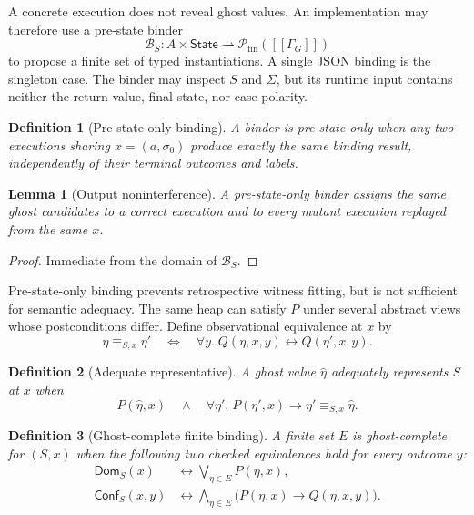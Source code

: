 \documentclass[10pt]{article}
\newtheorem{definition}{Definition}
\newtheorem{lemma}{Lemma}
\newcommand{\State}{\mathsf{State}}
\newcommand{\sem}[1]{[\![ #1 ]\!]}
\newcommand{\bind}{\mathcal{B}}
\newcommand{\ctx}{\Sigma}
\newcommand{\ghost}{\eta}
\begin{document}
A concrete execution does not reveal ghost values.  An implementation may
therefore use a pre-state binder
\[
  \bind_S : A\times\State
  \rightharpoonup \mathcal P_{\mathrm{fin}}(\sem{\Gamma_G})
\]
to propose a finite set of typed instantiations.  A single JSON binding is the
singleton case.  The binder may inspect $S$ and $\ctx$, but its runtime input
contains neither the return value, final state, nor case polarity.

\begin{definition}[Pre-state-only binding]
A binder is pre-state-only when any two executions sharing $x=(a,\sigma_0)$
produce exactly the same binding result, independently of their terminal
outcomes and labels.
\end{definition}

\begin{lemma}[Output noninterference]
A pre-state-only binder assigns the same ghost candidates to a correct
execution and to every mutant execution replayed from the same $x$.
\end{lemma}
\begin{proof}
Immediate from the domain of $\bind_S$.
\end{proof}

Pre-state-only binding prevents retrospective witness fitting, but is not
sufficient for semantic adequacy.  The same heap can satisfy $P$ under several
abstract views whose postconditions differ.  Define observational equivalence
at $x$ by
\[
  \ghost \equiv_{S,x} \ghost'
  \quad\Longleftrightarrow\quad
  \forall y.\;Q(\ghost,x,y)\leftrightarrow Q(\ghost',x,y).
\]

\begin{definition}[Adequate representative]
A ghost value $\widehat\ghost$ adequately represents $S$ at $x$ when
\[
  P(\widehat\ghost,x)
  \quad\land\quad
  \forall\ghost'.\;
    P(\ghost',x)\rightarrow
    \ghost'\equiv_{S,x}\widehat\ghost.
\]
\end{definition}

\begin{definition}[Ghost-complete finite binding]
A finite set $E$ is ghost-complete for $(S,x)$ when the following two checked
equivalences hold for every outcome $y$:
\[
\begin{split}
\mathsf{Dom}_S(x)
  &\leftrightarrow \bigvee_{\ghost\in E}P(\ghost,x),\\
\mathsf{Conf}_S(x,y)
  &\leftrightarrow
    \bigwedge_{\ghost\in E}\bigl(P(\ghost,x)\rightarrow Q(\ghost,x,y)\bigr).
\end{split}
\]
\end{definition}
\end{document}
